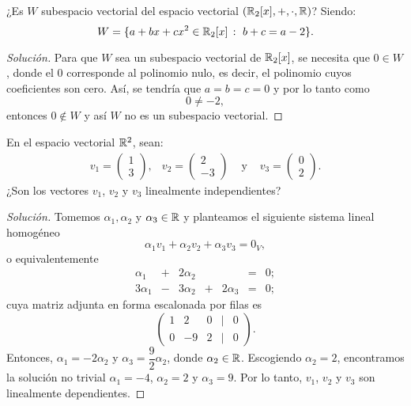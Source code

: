 \documentclass[a4,11pt]{aleph-notas}
\begin{document}
\begin{ejer}
    ¿Es $W$ subespacio vectorial del espacio vectorial $(\mathbb{R}_2[x], + , \cdot, \mathbb{R})$? Siendo: 
    \[W = \{ a + bx + cx^2 \in \mathbb{R}_2[x]\,:\, \, b + c = a - 2 \}.\]
\end{ejer}

\begin{proof}[Solución]\hspace{0pt}
    Para que $W$ sea un subespacio vectorial de $\mathbb{R}_2[x]$, se necesita que $0\in W$, donde el $0$ corresponde al polinomio nulo, es decir, el polinomio cuyos coeficientes son cero. Así, se tendría que $a=b=c=0$ y por lo tanto como
    \[
         0 \neq -2,
    \]
    entonces $0\notin W$ y así $W$ no es un subespacio vectorial. 
\end{proof}

\begin{ejer}
    En el espacio vectorial $\mathbb{R}^{2}$, sean:
    \[
        \begin{array}{cccc}
            v_1 = \begin{pmatrix} 1\\ 3 \end{pmatrix}, &
            v_2 = \begin{pmatrix} 2\\ -3 \end{pmatrix} &
            \text{ y } &
            v_3 = \begin{pmatrix} 0\\ 2 \end{pmatrix}.
        \end{array}
    \]
    ¿Son los vectores $v_1$, $v_2$ y $v_3$ linealmente independientes?
\end{ejer}

\begin{proof}[Solución]\hspace{0pt}
    Tomemos $\alpha_1, \alpha_2$ y $\alpha_3\in\mathbb{R}$ y planteamos el siguiente sistema lineal homogéneo
    \[
        \alpha_1 v_1 + \alpha_2 v_2 + \alpha_3 v_3 = 0_V,
    \]
    o equivalentemente
    \[
        \begin{array}{ccccccc}
            \alpha_1 & + & 2\alpha_2 & & & = & 0;\\
            3\alpha_1 & - & 3\alpha_2 & + & 2\alpha_3& = & 0;
        \end{array}
    \]
    cuya matriz adjunta en forma escalonada por filas es
    \[
        \begin{pmatrix}
            1 & 2 & 0 & | & 0\\
            0 & -9 & 2 & | & 0
        \end{pmatrix}.
    \]
    Entonces, $\alpha_1 = -2\alpha_2$ y $\alpha_3 = \dfrac{9}{2}\alpha_2$, donde $\alpha_2\in\mathbb{R}$. Escogiendo $\alpha_{2} = 2$, encontramos la solución no trivial $\alpha_{1}=-4$, $\alpha_2=2$ y $\alpha_3 = 9$. Por lo tanto, $v_1$, $v_2$ y $v_3$ son linealmente dependientes.
\end{proof}
\end{document}
